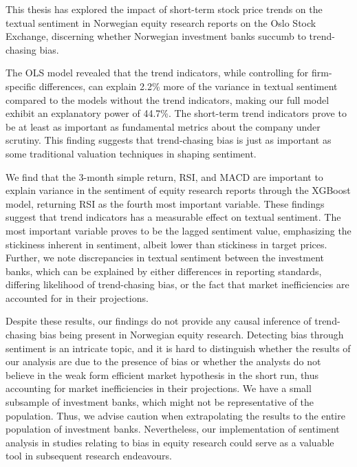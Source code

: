 
This thesis has explored the impact of short-term stock price trends on the textual sentiment in Norwegian equity research reports on the Oslo Stock Exchange, discerning whether Norwegian investment banks succumb to trend-chasing bias.

The OLS model revealed that the trend indicators, while controlling for firm-specific differences, can explain 2.2\% more of the variance in textual sentiment compared to the models without the trend indicators, making our full model exhibit an explanatory power of 44.7\%. The short-term trend indicators prove to be at least as important as fundamental metrics about the company under scrutiny. This finding suggests that trend-chasing bias is just as important as some traditional valuation techniques in shaping sentiment. 

We find that the 3-month simple return, RSI, and MACD are important to explain variance in the sentiment of equity research reports through the XGBoost model, returning RSI as the fourth most important variable. These findings suggest that trend indicators has a measurable effect on textual sentiment. The most important variable proves to be the lagged sentiment value, emphasizing the stickiness inherent in sentiment, albeit lower than stickiness in target prices. Further, we note discrepancies in textual sentiment between the investment banks, which can be explained by either differences in reporting standards, differing likelihood of trend-chasing bias, or the fact that market inefficiencies are accounted for in their projections. 

Despite these results, our findings do not provide any causal inference of trend-chasing bias being present in Norwegian equity research. Detecting bias through sentiment is an intricate topic, and it is hard to distinguish whether the results of our analysis are due to the presence of bias or whether the analysts do not believe in the weak form efficient market hypothesis in the short run, thus accounting for market inefficiencies in their projections. We have a small subsample of investment banks, which might not be representative of the population. Thus, we advise caution when extrapolating the results to the entire population of investment banks. Nevertheless, our implementation of sentiment analysis in studies relating to bias in equity research could serve as a valuable tool in subsequent research endeavours.


